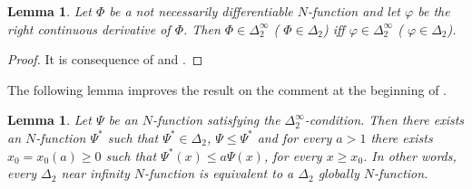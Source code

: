 \documentclass[twoside]{article}
\newtheorem{lem}[thm]{Lemma}
\theoremstyle{remark}
\renewcommand{\leq}{\leqslant}
\renewcommand{\geq}{\geqslant}
\begin{document}
\begin{lem}\label{lema:delta_2 y der} Let $\Phi$ be a not necessarily differentiable $N$-function and 
let $\varphi$ be the right continuous derivative of $\Phi$. Then $\Phi\in\Delta_2^{\infty}$ (
$\Phi\in\Delta_2$) iff $\varphi\in\Delta_2^{\infty}$ (
$\varphi\in\Delta_2$).
\end{lem}
\begin{proof}  It is consequence of \cite[Thm. 11.7]{M} and \cite[Rem. 5, p. 87]{M}.

\end{proof}

The following lemma improves the result on the comment at the beginning of \cite[p. 24]{KR}.

\begin{lem}\label{lem:delta2-equiv-delta2-global} Let $\Psi$ be an $N$-function satisfying the $\Delta_2^{\infty}$-condition. Then there exists an $N$-function $\Psi^*$  such that $\Psi^*\in\Delta_2$, $\Psi\leq\Psi^*$ and for every $a>1$ there exists $x_0=x_0(a)\geq 0$ such that $\Psi^*(x)\leq a\Psi(x)$, for every $x\geq x_0$.  In other words,  every $\Delta_2$ near infinity  $N$-function is equivalent to a $\Delta_2$ globally $N$-function.
\end{lem}
\end{document}
